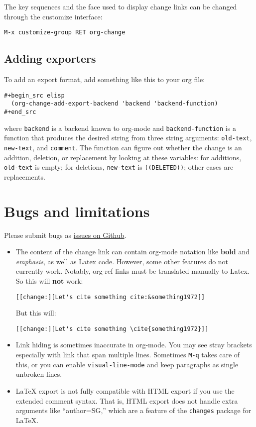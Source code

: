 \documentclass[11pt]{article}
\begin{document}
The key sequences and the face used to display change links can be
changed through the customize interface:
\begin{verbatim}
M-x customize-group RET org-change
\end{verbatim}

\subsection{Adding exporters}
\label{sec:orga0d0fa0}

To add an export format, add something like this to your org file:
\begin{verbatim}
#+begin_src elisp
  (org-change-add-export-backend 'backend 'backend-function)
#+end_src
\end{verbatim}
where \texttt{backend} is a backend known to org-mode and \texttt{backend-function}
is a function that produces the desired string from three string
arguments: \texttt{old-text}, \texttt{new-text}, and \texttt{comment}. The function can
figure out whether the change is an addition, deletion, or replacement
by looking at these variables: for additions, \texttt{old-text} is empty; for
deletions, \texttt{new-text} is \texttt{((DELETED))}; other cases are replacements.

\section{Bugs and limitations}
\label{sec:org5dd94b3}

Please submit bugs as \href{https://github.com/drghirlanda/org-change/issues}{issues on Github}.

\begin{itemize}
\item The content of the change link can contain org-mode notation like
\textbf{bold} and \emph{emphasis}, as well as Latex code. However, some other
features do not currently work. Notably, org-ref links must be
translated manually to Latex. So this will \textbf{not} work:
\begin{verbatim}
[[change:][Let's cite something cite:&something1972]]
\end{verbatim}
But this will:
\begin{verbatim}
[[change:][Let's cite something \cite{something1972}]]
\end{verbatim}
\item Link hiding is sometimes inaccurate in org-mode. You may see stray
brackets especially with link that span multiple lines. Sometimes \texttt{M-q}
takes care of this, or you can enable \texttt{visual-line-mode} and keep
paragraphs as single unbroken lines.
\item \LaTeX{} export is not fully compatible with HTML export if you use the
extended comment syntax. That is, HTML export does not handle extra
arguments like ``author=SG,'' which are a feature of the \texttt{changes}
package for \LaTeX{}.
\end{itemize}
\end{document}
